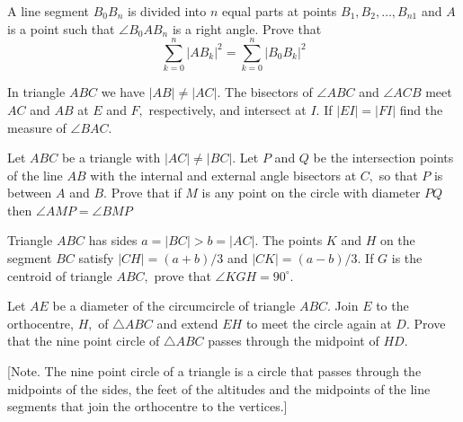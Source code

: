 \documentclass{pset}
\begin{document}
\begin{problems}
\begin{problem}
\end{problem}


\begin{problem}[IrMO 2017 Q8]
    A line segment \(B_{0} B_{n}\) is divided into \(n\) equal parts at points \(B_{1}, B_{2}, \ldots, B_{n 1}\) and
    \(A\) is a point such that \(\angle B_{0} A B_{n}\) is a right angle. Prove that
    $$
    \sum_{k=0}^{n}\left|A B_{k}\right|^{2}=\sum_{k=0}^{n}\left|B_{0} B_{k}\right|^{2}
    $$
\end{problem}

\begin{problem}[IrMO 2016 Q2]
    In triangle \(A B C\) we have \(|A B| \neq|A C| .\) The bisectors of \(\angle A B C\) and \(\angle A C B\) meet
    \(A C\) and \(A B\) at \(E\) and \(F,\) respectively, and intersect at \(I .\) If \(|E I|=|F I|\) find the measure of \(\angle B A C\).
\end{problem}


\begin{problem}[IrMO 2016 Q4]
    Let \(A B C\) be a triangle with \(|A C| \neq|B C| .\) Let \(P\) and \(Q\) be the intersection points of the line \(A B\) with the internal and external angle bisectors at \(C,\) so that \(P\) is between \(A\) and \(B .\) Prove that if \(M\) is any point on the circle with diameter \(P Q\) then \(\angle A M P=\angle B M P\)
\end{problem}

\begin{problem}[IrMO 2016 Q6]
    Triangle \(A B C\) has sides \(a=|B C|>b=|A C| .\) The points \(K\) and \(H\) on the segment \(B C\) satisfy \(|C H|=(a+b) / 3\) and \(|C K|=(a-b) / 3 .\) If \(G\) is the centroid of triangle \(A B C,\) prove that \(\angle K G H=90^{\circ} .\)
\end{problem}

\begin{problem}[IrMO 2016 Q10]
    Let \(A E\) be a diameter of the circumcircle of triangle \(A B C .\) Join \(E\) to the orthocentre, \(H,\) of \(\triangle A B C\) and extend \(E H\) to meet the circle again at \(D .\) Prove that the nine point circle of \(\triangle A B C\) passes through the midpoint of \(H D .\)
    
    [Note. The nine point circle of a triangle is a circle that passes through the midpoints of the sides, the feet of the altitudes and the midpoints of the line segments that join the orthocentre to the vertices.]
\end{problem}



\end{problems}
\end{document}
